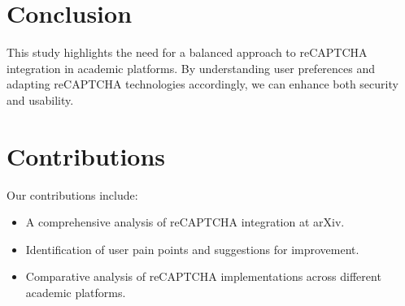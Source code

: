 \documentclass{article}
\begin{document}
\section{Conclusion}
This study highlights the need for a balanced approach to reCAPTCHA integration in academic platforms. By understanding user preferences and adapting reCAPTCHA technologies accordingly, we can enhance both security and usability.

\section{Contributions}
Our contributions include:
\begin{itemize}
    \item A comprehensive analysis of reCAPTCHA integration at arXiv.
    \item Identification of user pain points and suggestions for improvement.
    \item Comparative analysis of reCAPTCHA implementations across different academic platforms.
\end{itemize}



\end{document}
